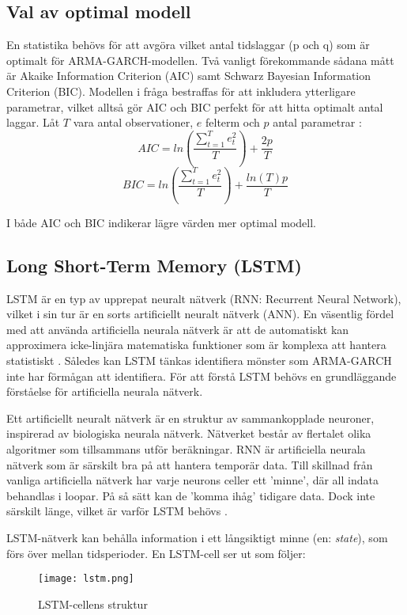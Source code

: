 \documentclass[11pt]{article}
\begin{document}
\subsection{Val av optimal modell}
En statistika behövs för att avgöra vilket antal tidslaggar (p och q) som är optimalt för ARMA-GARCH-modellen. Två vanligt förekommande sådana mått är Akaike Information Criterion (AIC) samt Schwarz Bayesian Information Criterion (BIC). Modellen i fråga bestraffas för att inkludera ytterligare parametrar, vilket alltså gör AIC och BIC perfekt för att hitta optimalt antal laggar. Låt $T$ vara antal observationer, $e$ felterm och $p$ antal parametrar \parencite{montgomery2015forecasting}:
\begin{equation}
    AIC = ln\left( \frac{\sum_{t=1}^{T}e^2_t}{T} \right)+\frac{2p}{T}
\end{equation}
\begin{equation}
    BIC = ln\left( \frac{\sum_{t=1}^{T}e^2_t}{T} \right)+\frac{ln(T)p}{T}
\end{equation}

I både AIC och BIC indikerar lägre värden mer optimal modell. 

\subsection{Long Short-Term Memory (LSTM)}
LSTM är en typ av upprepat neuralt nätverk (RNN: Recurrent Neural Network), vilket i sin tur är en sorts artificiellt neuralt nätverk (ANN). En väsentlig fördel med att använda artificiella neurala nätverk är att de automatiskt kan approximera icke-linjära matematiska funktioner som är komplexa att hantera statistiskt \parencite{paliwal2009neural}. Således kan LSTM tänkas identifiera mönster som ARMA-GARCH inte har förmågan att identifiera.  För att förstå LSTM behövs en grundläggande förståelse för artificiella neurala nätverk. 

Ett artificiellt neuralt nätverk är en struktur av sammankopplade neuroner, inspirerad av biologiska neurala nätverk. Nätverket består av flertalet olika algoritmer som tillsammans utför beräkningar. RNN är artificiella neurala nätverk som är särskilt bra på att hantera temporär data. Till skillnad från vanliga artificiella nätverk har varje neurons celler ett 'minne', där all indata behandlas i loopar. På så sätt kan de 'komma ihåg' tidigare data. Dock inte särskilt länge, vilket är varför LSTM behövs \parencite{purkait2019hands}. 

LSTM-nätverk kan behålla information i ett långsiktigt minne (en: \textit{state}), som förs över mellan tidsperioder. En LSTM-cell ser ut som följer:
\begin{figure}[H]
\caption{LSTM-cellens struktur \parencite[lånad från][]{yuan2019nonlinear}}
\texttt{[image: lstm.png]}
\centering
\end{figure}
\end{document}
